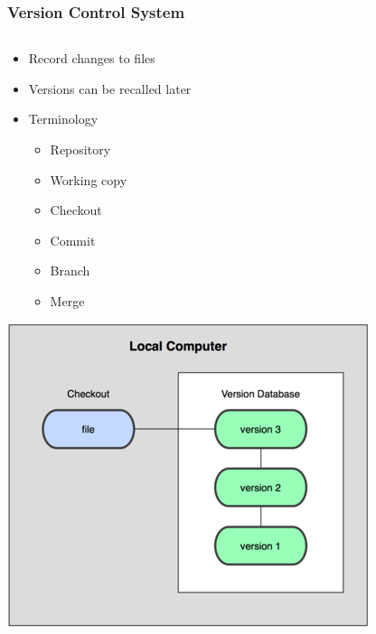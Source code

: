 \documentclass[english,compress]{beamer}
\begin{document}
\frame
{
    \frametitle{Version Control System}
    \begin{columns}
    \begin{column}{.7\textwidth}
    \begin{itemize}
        \item Record changes to files
        \item Versions can be recalled later
        \item Terminology
        \begin{itemize}
            \item Repository
            \item Working copy
            \item Checkout
            \item Commit
            \item Branch
            \item Merge
        \end{itemize}
    \end{itemize}
    \includegraphics[width=.5\textwidth]{figs/vc.png}
    \end{column}
    \begin{column}{.3\textwidth}
    \begin{center}

\end{center}
\end{column}
\end{columns}}
\end{document}
